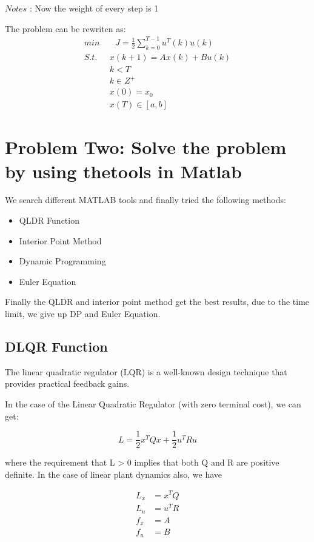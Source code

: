 \documentclass{mcmthesis}
\begin{document}
$Notes$ : Now the weight of every step is 1

The problem can be rewriten as:
\begin{align}
min & \text{ } J=\frac{1}{2}\sum^{T-1}_{k=0}u^T(k)u(k)\\
S.t. \text{ }& x(k+1)=A x(k)+B u(k)\\ &  k < T\\& k \in Z^+ \\&x(0)=x_0\\&x(T)\in  [a,b]
\end{align}


\section{Problem Two: Solve the problem by using thetools in Matlab }
We search different MATLAB tools and finally tried the following methods:

\begin{itemize}

\item QLDR Function
\item Interior Point Method
\item Dynamic Programming 
\item Euler Equation

\end{itemize}

Finally the QLDR and interior point method get the best results, due to the time limit, we give up DP and Euler Equation.

\subsection{DLQR Function}

The linear quadratic regulator (LQR) is a well-known design technique that provides practical feedback gains.\cite{journals/corr/WangMD14}\cite{conf/iros/AmesK19}

In the case of the Linear Quadratic Regulator (with zero terminal cost), we can get:

$$L=\frac{1}{2} x^{T} Q x+\frac{1}{2} u^{T} R u$$

where the requirement that L > 0 implies that both Q and R are positive definite. In the
case of linear plant dynamics also, we have


$$\begin{aligned}
L_{x} &=x^{T} Q \\
L_{u} &=u^{T} R \\
f_{x} &=A \\
f_{u} &=B
\end{aligned}$$
\end{document}
